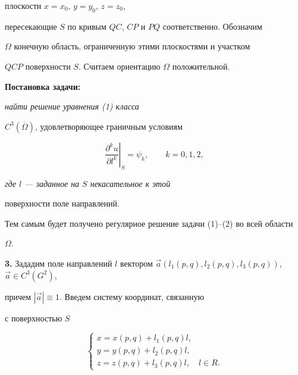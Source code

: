 плоскости $x=x_{0}$, $y=y_{0}$, $z=z_{0}$,


пересекающие $S$ по кривым $QC$, $CP$ и $PQ$ соответственно. Обозначим


$\Omega $ конечную область, ограниченную этими плоскостями и участком


$QCP$ поверхности $S$. Считаем ориентацию $\Omega $ положительной.





{\bf Постановка задачи:} {\it найти решение уравнения {\em (1)} класса


$C^{3}(\overline{\Omega } )$, удовлетворяющее граничным условиям}


\begin{equation}


\left.\frac{\partial^{k} u}{\partial l^{k}} \right\vert_{S} = \psi_{k},


\qquad k=0,1,2,


\end{equation}


{\it где $l$ --- заданное на $S$ некасательное к этой


поверхности поле направлений.}





Тем самым будет получено регулярное решение задачи (1)--(2) во всей области


$\Omega$.





{\bf 3.} Зададим поле направлений $l$ вектором $\Vec{a}


(l_{1}(p,q),l_{2}(p,q),l_{3}(p,q))$, $\Vec{a}\in C^{3}(G^{2})$,


причем $|\Vec{a}|\equiv 1$. Введем систему координат, связанную


с поверхностью $S$


\begin{equation}


\begin{cases}


x=x(p,q)+l_{1}(p,q)l, \\


y=y(p,q)+l_{2}(p,q)l, \\


z=z(p,q)+l_{3}(p,q)l, \quad l\in R.


\end{cases}


\end{equation}





